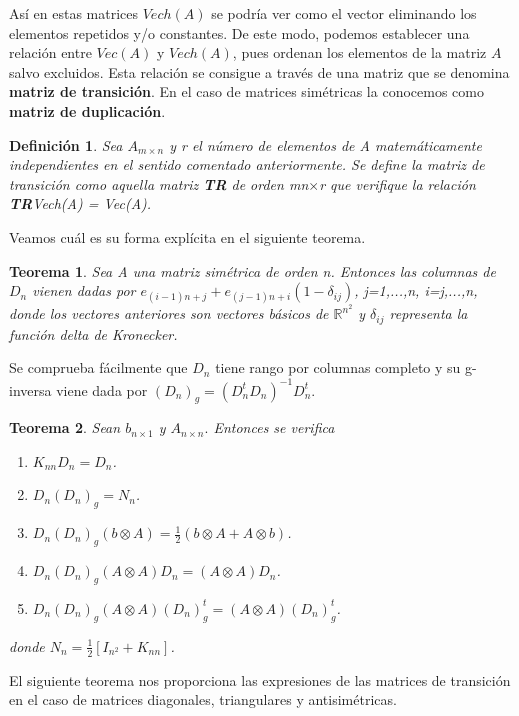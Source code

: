 \documentclass{article}
\theoremstyle{theorem-style}  %
\newtheorem{theorem}{Teorema}[section]  %
\theoremstyle{definition-style}
\newtheorem{definition}{Definición}[section]
\theoremstyle{example-style}
\theoremstyle{exercise-style}
\begin{document}
Así en estas matrices $Vech(A)$ se podría ver como el vector eliminando los elementos repetidos y/o constantes. De este modo, podemos establecer una relación entre $Vec(A)$ y $Vech(A)$, pues ordenan los elementos de la matriz $A$ salvo excluidos. Esta relación se consigue a través de una matriz que se denomina \textbf{matriz de transición}. En el caso de matrices simétricas la conocemos como \textbf{matriz de duplicación}.

\begin{definition}
	Sea $A_{m\times n}$ y r el número de elementos de A matemáticamente independientes en el sentido comentado anteriormente. Se define la matriz de transición como aquella matriz \textbf{TR} de orden mn$\times$r que verifique la relación \textbf{TR}Vech(A) = Vec(A).
\end{definition}

Veamos cuál es su forma explícita en el siguiente teorema.

\begin{theorem}
	Sea A una matriz simétrica de orden n. Entonces las columnas de $D_n$ vienen dadas por $e_{(i-1)n+j}+e_{(j-1)n+i}(1-\delta_{ij})$, j=1,...,n, i=j,...,n, donde los vectores anteriores son vectores básicos de $\mathbb{R}^{n^2}$ y $\delta_{ij}$ representa la función delta de Kronecker.
\end{theorem}

Se comprueba fácilmente que $D_n$ tiene rango por columnas completo y su g-inversa viene dada por $(D_n)_g = (D^t_nD_n)^{-1}D_n^t$.

\begin{theorem}
	Sean $b_{n\times 1}$ y $A_{n\times n}.$ Entonces se verifica
	\begin{enumerate}
		\item $K_{nn}D_n = D_n$.
		\item $D_n(D_n)_g=N_n$.
		\item $D_n(D_n)_g(b\otimes A) = \frac{1}{2}(b\otimes A + A\otimes b)$.
		\item $D_n(D_n)_g(A\otimes A)D_n = (A\otimes A)D_n$.
		\item $D_n(D_n)_g(A\otimes A)(D_n)_g^t = (A\otimes A)(D_n)^t_g$.
	\end{enumerate}
	donde $N_n = \frac{1}{2}[I_{n^2}+K_{nn}]$.
\end{theorem}

El siguiente teorema nos proporciona las expresiones de las matrices de transición en el caso de matrices diagonales, triangulares y antisimétricas.
\end{document}
